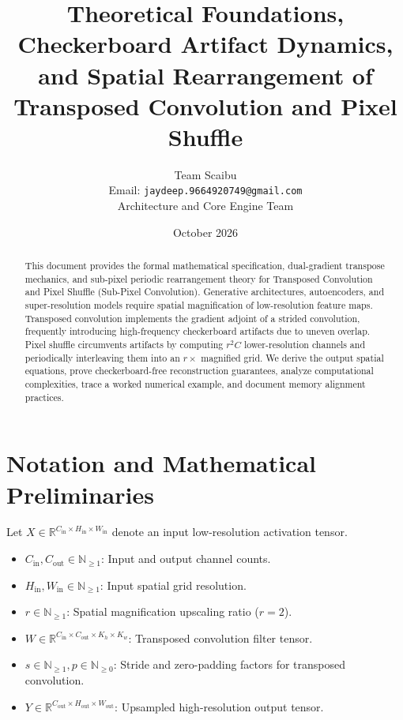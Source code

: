 \documentclass[11pt,a4paper]{article}
\title{\textbf{Theoretical Foundations, Checkerboard Artifact Dynamics, and Spatial Rearrangement of Transposed Convolution and Pixel Shuffle}}
\author{Team Scaibu \\ \small Email: \texttt{jaydeep.9664920749@gmail.com} \\ \small Architecture and Core Engine Team}
\date{October 2026}
\theoremstyle{definition}
\begin{document}
\maketitle

\begin{abstract}
This document provides the formal mathematical specification, dual-gradient transpose mechanics, and sub-pixel periodic rearrangement theory for Transposed Convolution and Pixel Shuffle (Sub-Pixel Convolution). Generative architectures, autoencoders, and super-resolution models require spatial magnification of low-resolution feature maps. Transposed convolution implements the gradient adjoint of a strided convolution, frequently introducing high-frequency checkerboard artifacts due to uneven overlap. Pixel shuffle circumvents artifacts by computing $r^2 C$ lower-resolution channels and periodically interleaving them into an $r\times$ magnified grid. We derive the output spatial equations, prove checkerboard-free reconstruction guarantees, analyze computational complexities, trace a worked numerical example, and document memory alignment practices.
\end{abstract}

\section{Notation and Mathematical Preliminaries}

Let $X \in \mathbb{R}^{C_{\text{in}} \times H_{\text{in}} \times W_{\text{in}}}$ denote an input low-resolution activation tensor.

\begin{itemize}
    \item $C_{\text{in}}, C_{\text{out}} \in \mathbb{N}_{\ge 1}$: Input and output channel counts.
    \item $H_{\text{in}}, W_{\text{in}} \in \mathbb{N}_{\ge 1}$: Input spatial grid resolution.
    \item $r \in \mathbb{N}_{\ge 1}$: Spatial magnification upscaling ratio ($r = 2$).
    \item $W \in \mathbb{R}^{C_{\text{in}} \times C_{\text{out}} \times K_h \times K_w}$: Transposed convolution filter tensor.
    \item $s \in \mathbb{N}_{\ge 1}, p \in \mathbb{N}_{\ge 0}$: Stride and zero-padding factors for transposed convolution.
    \item $Y \in \mathbb{R}^{C_{\text{out}} \times H_{\text{out}} \times W_{\text{out}}}$: Upsampled high-resolution output tensor.
\end{itemize}
\end{document}
